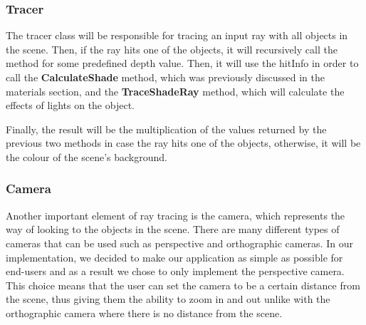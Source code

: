 \documentclass[a4paper]{report}
\begin{document}
	\subsubsection{Tracer}
	The tracer class will be responsible for tracing an input ray with all objects in the scene. Then, if the ray hits one of the objects, it will recursively call the method for some predefined depth value. Then, it will use the hitInfo in order to call the \textbf{CalculateShade} method, which was previously discussed in the materials section, and the \textbf{TraceShadeRay} method, which will calculate the effects of lights on the object.\newline
	\par Finally, the result will be the multiplication of the values returned by the previous two methods in case the ray hits one of the objects, otherwise, it will be the colour of the scene's background.
	\subsubsection{Camera}
	\label{sssec:cam}Another important element of ray tracing is the camera, which represents the way of looking to the objects in the scene. There are many different types of cameras that can be used such as perspective and orthographic cameras. In our implementation, we decided to make our application as simple as possible for end-users and as a result we chose to only implement the perspective camera. This choice means that the user can set the camera to be a certain distance from the scene, thus giving them the ability to zoom in and out unlike with the orthographic camera where there is no distance from the scene.
	
\end{document}
